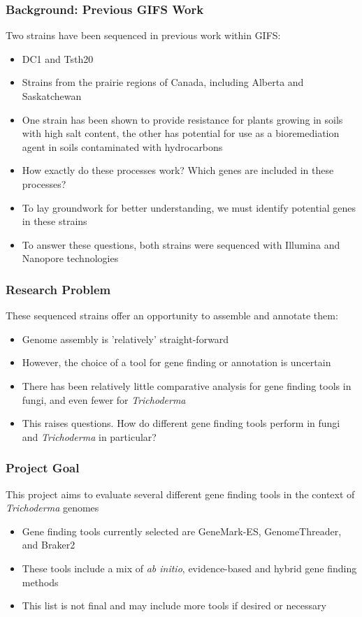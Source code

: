 \documentclass{beamer}
\begin{document}
\begin{frame}
  \frametitle{Background: Previous GIFS Work}
  Two strains have been sequenced in previous work within GIFS:
  \begin{itemize}
  \item DC1 and Tsth20
  \item Strains from the prairie regions of Canada, including Alberta
    and Saskatchewan
  \item One strain has been shown to provide resistance for plants
    growing in soils with high salt content, the other has potential
    for use as a bioremediation agent in soils contaminated with
    hydrocarbons
  \item How exactly do these processes work? Which genes are included
    in these processes?
  \item To lay groundwork for better understanding, we must identify
    potential genes in these strains
  \item To answer these questions, both strains were sequenced with
    Illumina and Nanopore technologies
  \end{itemize}
\end{frame}

\begin{frame}
  \frametitle{Research Problem} These sequenced strains offer an
  opportunity to assemble and annotate them:
  \begin{itemize}
  \item Genome assembly is 'relatively' straight-forward
  \item However, the choice of a tool for gene finding or annotation
    is uncertain
  \item There has been relatively little comparative analysis for gene
    finding tools in fungi, and even fewer for \textit{Trichoderma}
  \item This raises questions. How do different gene finding tools
    perform in fungi and \textit{Trichoderma} in particular?
  \end{itemize}
\end{frame}

\begin{frame}
  \frametitle{Project Goal} This project aims to evaluate several
  different gene finding tools in the context of \textit{Trichoderma}
  genomes
  \begin{itemize}
    \item Gene finding tools currently selected are GeneMark-ES,
      GenomeThreader, and Braker2
    \item These tools include a mix of \textit{ab initio},
      evidence-based and hybrid gene finding methods
    \item This list is not final and may include more tools if
      desired or necessary
  \end{itemize}
\end{frame}
\end{document}
